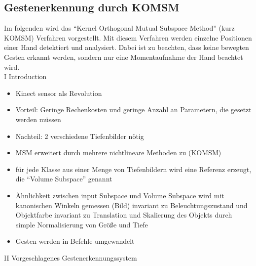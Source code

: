\subsection{Gestenerkennung durch KOMSM}
Im folgenden wird das ``Kernel Orthogonal Mutual Subspace Method'' (kurz KOMSM) Verfahren vorgestellt. Mit diesem Verfahren werden einzelne Positionen einer Hand detektiert und analysiert. Dabei ist zu beachten, dass keine bewegten Gesten erkannt werden, sondern nur eine Momentaufnahme der Hand beachtet wird. \\


I Introduction
\begin{itemize}
\item Kinect sensor als Revolution
\item Vorteil: Geringe Rechenkosten und geringe Anzahl an Parametern, die gesetzt werden müssen
\item Nachteil: 2 verschiedene Tiefenbilder n\"otig
\item MSM erweitert durch mehrere nichtlineare Methoden zu (KOMSM)
\item für jede Klasse aus einer Menge von Tiefenbildern wird eine Referenz erzeugt, die ``Volume Subspace'' genannt
\item Ähnlichkeit zwischen input Subspace und Volume Subspace wird mit kanonischen Winkeln gemessen (Bild)
\subitem invariant zu Beleuchtungszustand und Objektfarbe
\subitem invariant zu Translation und Skalierung des Objekts durch simple Normalisierung von Gr\"oße und Tiefe
\item Gesten werden in Befehle umgewandelt
\end{itemize}
II Vorgeschlagenes Gestenerkennungssystem
